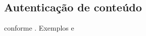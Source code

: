 \subsection{Autentica\c{c}\~ao de conte\'udo}
\label{subsection:autenticacao_conteudo}
conforme \cite{pomelo2009analysis}. Exemplos \cite{wein2012content} e \cite{leighton2007html}